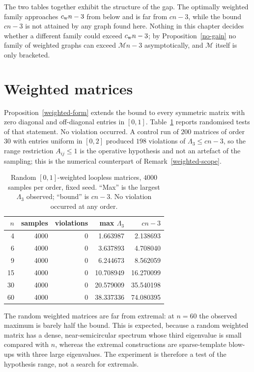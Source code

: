 The two tables together exhibit the structure of the gap. The optimally
weighted family approaches $c_{\mathrm{w}} n-3$ from below and is far from $cn-3$,
while the bound $cn-3$ is not attained by any graph found here. Nothing in
this chapter decides whether a different family could exceed $c_{\mathrm{w}} n-3$; by
Proposition~\ref{no-gain} no family of weighted graphs can exceed
$\mathcal M n-3$ asymptotically, and $\mathcal M$ itself is only bracketed.

\section{Weighted matrices}\label{sec-num-weighted}
Proposition~\ref{weighted-form} extends the bound to every symmetric matrix
with zero diagonal and off-diagonal entries in $[0,1]$. Table~\ref{tab-weighted}
reports randomised tests of that statement. No violation occurred. A control run of $200$ matrices of order $30$ with entries uniform in
$[0,2]$ produced $198$ violations of $\Lambda_3\le cn-3$, so the range
restriction $A_{ij}\le1$ is the operative hypothesis and not an artefact of
the sampling; this is the numerical counterpart of Remark~\ref{weighted-scope}.

\begin{table}[htbp]
\centering
\singlespacing
\caption{Random $[0,1]$-weighted loopless matrices, $4000$ samples per order,
fixed seed. ``Max'' is the largest $\Lambda_3$ observed; ``bound'' is $cn-3$.
No violation occurred at any order.}\label{tab-weighted}
\small
\begin{tabular}{@{}r r r r r@{}}
\toprule
$n$ & samples & violations & max $\Lambda_3$ & $cn-3$ \\
\midrule
4 & 4000 & 0 & 1.663987 & 2.138693 \\
6 & 4000 & 0 & 3.637893 & 4.708040 \\
9 & 4000 & 0 & 6.244673 & 8.562059 \\
15 & 4000 & 0 & 10.708949 & 16.270099 \\
30 & 4000 & 0 & 20.579009 & 35.540198 \\
60 & 4000 & 0 & 38.337336 & 74.080395 \\
\bottomrule
\end{tabular}
\end{table}

The random weighted matrices are far from extremal: at $n=60$ the observed
maximum is barely half the bound. This is expected, because a random weighted
matrix has a dense, near-semicircular spectrum whose third eigenvalue is small
compared with $n$, whereas the extremal constructions are sparse-template
blow-ups with three large eigenvalues. The experiment is therefore a test of
the hypothesis range, not a search for extremals.

